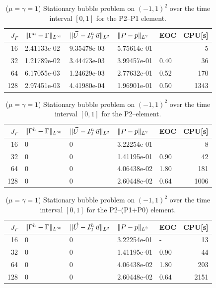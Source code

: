 \begin{table}
\center
\begin{tabular}{rllllr}
\hline
$J_\Gamma$ & $\|\Gamma^h - \Gamma\|_{L^\infty}$ & $\|\vec U - I^h_{2}\,\vec u\|_{L^2}$ & $\|P - p\|_{L^2}$ & EOC & CPU[s] \\
\hline
 16 & 2.41133e-02 & 9.35478e-03 & 5.75614e-01 &    - &    5 \\
 32 & 1.21789e-02 & 3.44473e-03 & 3.99457e-01 & 0.40 &   36 \\
 64 & 6.17055e-03 & 1.24629e-03 & 2.77632e-01 & 0.52 &  170 \\
128 & 2.97451e-03 & 4.41980e-04 & 1.96901e-01 & 0.50 & 1343 \\
\hline
\end{tabular}
\caption[Stokes 2d stationary bubble errors P2--P1]
{($\mu=\gamma=1$) Stationary bubble problem on $(-1,1)^2$ over the time
interval $[0,1]$ for the P2--P1 element.}
\label{tab:stokes_stationary_2d_p2p1}
\end{table}
\begin{table}
\center
\begin{tabular}{rllllr}
\hline
$J_\Gamma$ & $\|\Gamma^h - \Gamma\|_{L^\infty}$ & $\|\vec U - I^h_{2}\,\vec u\|_{L^2}$ & $\|P - p\|_{L^2}$ & EOC & CPU[s] \\
\hline
 16 & 0 & 0 & 3.22254e-01 &    - &    8 \\
 32 & 0 & 0 & 1.41195e-01 & 0.90 &   42 \\
 64 & 0 & 0 & 4.06438e-02 & 1.80 &  181 \\
128 & 0 & 0 & 2.60448e-02 & 0.64 & 1006 \\
\hline
\end{tabular}
\caption[Stokes 2d stationary bubble errors P2--\pdg]
{($\mu=\gamma=1$) Stationary bubble problem on $(-1,1)^2$ over the time
interval $[0,1]$ for the P2--\pdg element.}
\label{tab:stokes_stationary_2d_p2p1dg}
\end{table}
\begin{table}
 \center
\begin{tabular}{rllllr}
\hline
$J_\Gamma$ & $\|\Gamma^h - \Gamma\|_{L^\infty}$ & $\|\vec U - I^h_{2}\,\vec u\|_{L^2}$ & $\|P - p\|_{L^2}$ & EOC & CPU[s] \\
\hline
 16 & 0 & 0 & 3.22254e-01 &    - &   13 \\
 32 & 0 & 0 & 1.41195e-01 & 0.90 &   44 \\
 64 & 0 & 0 & 4.06438e-02 & 1.80 &  203 \\
128 & 0 & 0 & 2.60448e-02 & 0.64 & 2151 \\
\hline
\end{tabular}
\caption[Stokes 2d stationary bubble errors P2--(P1+P0)]
{($\mu=\gamma=1$) Stationary bubble problem on $(-1,1)^2$ over the time
interval $[0,1]$ for the P2--(P1+P0) element.}
\label{tab:stokes_stationary_2d_p2p1p0}
\end{table}

